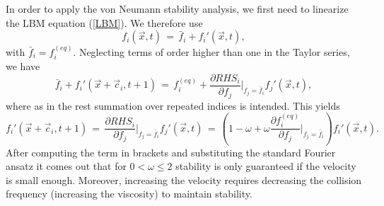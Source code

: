 In order to apply the von Neumann stability analysis, we first need to linearize the LBM equation (\ref{LBM}). We therefore use
\begin{equation}
 f_i(\vec x, t)\,=\, \bar f_i + f_i'(\vec x, t) ,\nonumber
\end{equation}
with $\bar f_i= f_i^{(eq)}$. Neglecting terms of order higher than one in the Taylor series, we have
\begin{equation}
 \bar f_i+f_i' (\vec x + \vec c_i, t+1)\,=\, f_i^{(eq)} +\frac{\partial{RHS_i}}{\partial{f_j}} \bigg |_{f_j=\bar f_i} f_j'(\vec x, t) ,\nonumber
\end{equation}
where as in the rest summation over repeated indices is intended. This yields
\begin{equation}
 f_i' (\vec x + \vec c_i, t+1)\,=\, \frac{\partial{RHS_i}}{\partial{f_j}} \bigg |_{f_j=\bar f_i} f_j'(\vec x, t)\,=\, \left(1-\omega+\omega   \frac{\partial{f_i^{(eq)}}}{\partial{f_j}} \bigg |_{f_j=\bar f_i} \right)  f_i'(\vec x, t) .\nonumber
\end{equation}
After computing the term in brackets and substituting the standard Fourier ansatz it comes out that for $0 < \omega \le 2$ stability is only guaranteed if the velocity is small enough. Moreover, increasing the velocity requires decreasing the collision frequency (increasing the viscosity) to maintain stability. 


